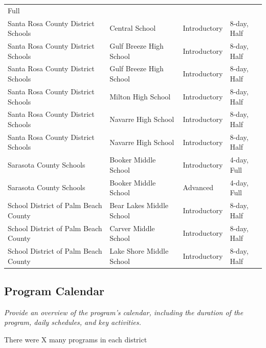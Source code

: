 \documentclass[
]{article}
\begin{document}
\begin{longtable}[]{@{}llll@{}}
Full \\
Santa Rosa County District Schools & Central School & Introductory &
8-day, Half \\
Santa Rosa County District Schools & Gulf Breeze High School &
Introductory & 8-day, Half \\
Santa Rosa County District Schools & Gulf Breeze High School &
Introductory & 8-day, Half \\
Santa Rosa County District Schools & Milton High School & Introductory &
8-day, Half \\
Santa Rosa County District Schools & Navarre High School & Introductory
& 8-day, Half \\
Santa Rosa County District Schools & Navarre High School & Introductory
& 8-day, Half \\
Sarasota County Schools & Booker Middle School & Introductory & 4-day,
Full \\
Sarasota County Schools & Booker Middle School & Advanced & 4-day,
Full \\
School District of Palm Beach County & Bear Lakes Middle School &
Introductory & 8-day, Half \\
School District of Palm Beach County & Carver Middle School &
Introductory & 8-day, Half \\
School District of Palm Beach County & Lake Shore Middle School &
Introductory & 8-day, Half \\
\end{longtable}

\hypertarget{program-calendar}{%
\subsection{Program Calendar}\label{program-calendar}}

\emph{Provide an overview of the program's calendar, including the
duration of the program, daily schedules, and key activities.}

There were X many programs in each district
\end{document}
